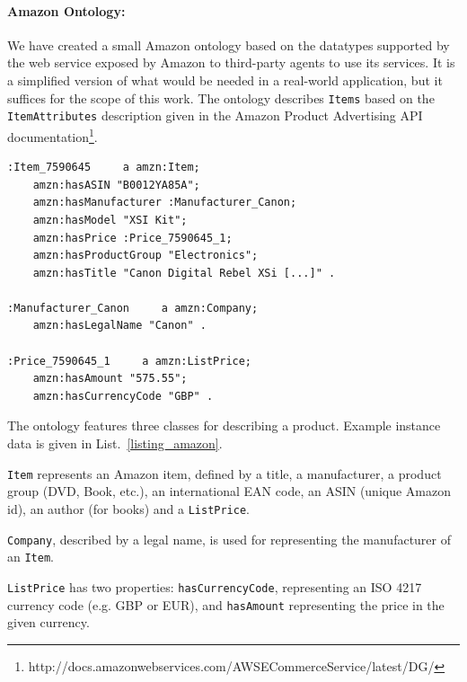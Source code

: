 \paragraph{Amazon Ontology:}
We have created a small Amazon ontology based on the datatypes supported by the web service exposed by Amazon to third-party agents to use its services. It is a simplified version of what would be needed in a real-world application, but it suffices for the scope of this work. The ontology describes \texttt{Items} based on the \texttt{ItemAttributes} description given in the Amazon Product Advertising API documentation\footnote{http://docs.amazonwebservices.com/AWSECommerceService/latest/DG/}.

\begin{center}
\lstset{captionpos=b, breaklines=true}
\lstset{frame=single, basicstyle=\scriptsize}
\lstset{caption=Simplified Amazon ontology data in N3 notation, label=listing_amazon}
\lstset{language=XML}
\begin{lstlisting}
:Item_7590645     a amzn:Item;
    amzn:hasASIN "B0012YA85A";
    amzn:hasManufacturer :Manufacturer_Canon;
    amzn:hasModel "XSI Kit";
    amzn:hasPrice :Price_7590645_1;
    amzn:hasProductGroup "Electronics";
    amzn:hasTitle "Canon Digital Rebel XSi [...]" .

:Manufacturer_Canon     a amzn:Company;
    amzn:hasLegalName "Canon" .

:Price_7590645_1     a amzn:ListPrice;
    amzn:hasAmount "575.55";
    amzn:hasCurrencyCode "GBP" .
\end{lstlisting}
\end{center}

The ontology features three classes for describing a product. Example instance data is given in List.~\ref{listing_amazon}.
\begin{inparaenum}[(1)]
    \item \texttt{Item} represents an Amazon item, defined by a title, a manufacturer, a product group (DVD, Book, etc.), an international EAN code, an ASIN (unique Amazon id), an author (for books) and a \texttt{ListPrice}. 
    \item \texttt{Company}, described by a  legal name, is used for representing the manufacturer of an \texttt{Item}.
    \item \texttt{ListPrice} has two properties: \texttt{hasCurrencyCode}, representing an ISO 4217 currency code (e.g. GBP or EUR), and \texttt{hasAmount} representing the price in the given currency.
\end{inparaenum}

